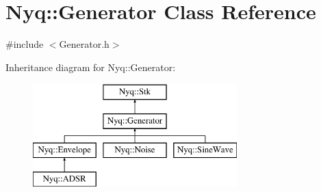 \hypertarget{class_nyq_1_1_generator}{}\section{Nyq\+:\+:Generator Class Reference}
\label{class_nyq_1_1_generator}


{\ttfamily \#include $<$Generator.\+h$>$}

Inheritance diagram for Nyq\+:\+:Generator\+:\begin{figure}[H]
\begin{center}
\leavevmode
\includegraphics[height=4.000000cm]{class_nyq_1_1_generator}
\end{center}
\end{figure}
